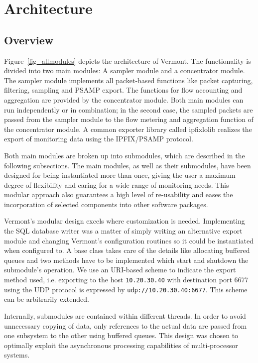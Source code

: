 \section{Architecture}
\label{sec:architecture}

\subsection{Overview}

Figure~\ref{fig_allmodules} depicts the architecture of Vermont.
The functionality is divided into two main modules: A sampler module and a concentrator module.
The sampler module implements all packet-based functions like packet capturing, filtering, sampling and PSAMP export.
The functions for flow accounting and aggregation are provided by the concentrator module.
Both main modules can run independently or in combination; in the second case, the sampled packets are passed from the sampler module to the flow metering and aggregation function of the concentrator module.
A common exporter library called ipfixlolib realizes the export of monitoring data using the IPFIX/PSAMP protocol.

Both main modules are broken up into submodules, which are described in the following subsections.
The main modules, as well as their submodules, have been designed for being instantiated more than once, giving the user a maximum degree of flexibility and caring for a wide range of monitoring needs.
This modular approach also guarantees a high level of re-usability and eases the incorporation of selected components into other software packages.

Vermont's modular design excels where customization is needed.
Implementing the SQL database writer was a matter of simply writing an alternative export module and changing Vermont's configuration routines so it could be instantiated when configured to.
A base class takes care of the details like allocating buffered queues and two methods have to be implemented which start and shutdown the submodule's operation.
We use an URI-based scheme to indicate the export method used, i.e. exporting to the host \texttt{10.20.30.40} with destination port 6677 using the UDP protocol is expressed by \texttt{udp://10.20.30.40:6677}. This scheme can be arbitrarily extended.

Internally, submodules are contained within different threads.
In order to avoid unnecessary copying of data, only references to the actual data are passed from one subsystem to the other using buffered queues.
This design was chosen to optimally exploit the asynchronous processing capabilities of multi-processor systems.


